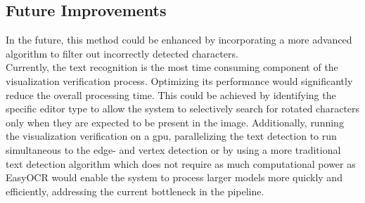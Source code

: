 \subsection{Future Improvements}
In the future, this method could be enhanced by incorporating a more advanced algorithm to filter out incorrectly detected characters.\\
Currently, the text recognition is the most time consuming component of the visualization verification process. Optimizing its performance would significantly reduce the overall processing time. This could be achieved by identifying the specific editor type to allow the system to selectively search for rotated characters only when they are expected to be present in the image. Additionally, running the visualization verification on a gpu, parallelizing the text detection to run simultaneous to the edge- and vertex detection or by using a more traditional text detection algorithm which does not require as much computational power as EasyOCR would enable the system to process larger models more quickly and efficiently, addressing the current bottleneck in the pipeline.\\
